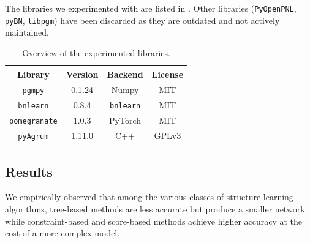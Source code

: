 \documentclass[letterpaper]{article}
\begin{document}
The libraries we experimented with are listed in .
Other libraries (\texttt{PyOpenPNL}, \texttt{pyBN}, \texttt{libpgm})
have been discarded as they are outdated and not actively maintained.

\begin{table}[h]
    \small
    \centering
    \begin{tabular}{cccc}
        \toprule
        \textbf{Library} & \textbf{Version} & \textbf{Backend} & \textbf{License}\\
        \midrule
        \texttt{pgmpy}          & 0.1.24    & Numpy             & MIT \\
        \texttt{bnlearn}        & 0.8.4     & \texttt{bnlearn}  & MIT \\
        \texttt{pomegranate}    & 1.0.3     & PyTorch           & MIT \\
        \texttt{pyAgrum}        & 1.11.0    & C++               & GPLv3 \\
        \bottomrule
    \end{tabular}
    \caption{Overview of the experimented libraries.} 
    \label{tab:libraries}
\end{table}




\subsection{Results}

We empirically observed that among the various classes of structure learning algorithms, 
tree-based methods are less accurate but produce a smaller network while
constraint-based and score-based methods achieve higher accuracy at the cost of a more complex model.
\end{document}
